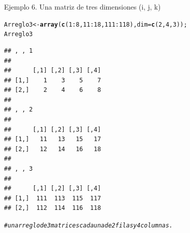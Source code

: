 \documentclass[12pt,letterpaper]{article}\usepackage[]{graphicx}\usepackage[]{color}
\makeatletter
\newcommand{\hlnum}[1]{\textcolor[rgb]{0.686,0.059,0.569}{#1}}%
\newcommand{\hlcom}[1]{\textcolor[rgb]{0.678,0.584,0.686}{\textit{#1}}}%
\newcommand{\hlopt}[1]{\textcolor[rgb]{0,0,0}{#1}}%
\newcommand{\hlstd}[1]{\textcolor[rgb]{0.345,0.345,0.345}{#1}}%
\newcommand{\hlkwb}[1]{\textcolor[rgb]{0.69,0.353,0.396}{#1}}%
\newcommand{\hlkwc}[1]{\textcolor[rgb]{0.333,0.667,0.333}{#1}}%
\newcommand{\hlkwd}[1]{\textcolor[rgb]{0.737,0.353,0.396}{\textbf{#1}}}%
\newenvironment{kframe}{%
 \def\at@end@of@kframe{}%
 \ifinner\ifhmode%
  \def\at@end@of@kframe{\end{minipage}}%
  \begin{minipage}{\columnwidth}%
 \fi\fi%
 \def\FrameCommand##1{\hskip\@totalleftmargin \hskip-\fboxsep
 \colorbox{shadecolor}{##1}\hskip-\fboxsep
     \hskip-\linewidth \hskip-\@totalleftmargin \hskip\columnwidth}%
 \MakeFramed {\advance\hsize-\width
   \@totalleftmargin\z@ \linewidth\hsize
   \@setminipage}}%
 {\par\unskip\endMakeFramed%
 \at@end@of@kframe}
\newenvironment{knitrout}{}{} %
\makeatother
\begin{document}
Ejemplo 6. Una matriz de tres dimensiones (i, j, k)
\begin{knitrout}
\color{fgcolor}\begin{kframe}
\begin{alltt}
\hlstd{Arreglo3} \hlkwb{<-} \hlkwd{array}\hlstd{(}\hlkwd{c}\hlstd{(}\hlnum{1}\hlopt{:}\hlnum{8}\hlstd{,} \hlnum{11}\hlopt{:}\hlnum{18}\hlstd{,} \hlnum{111}\hlopt{:}\hlnum{118}\hlstd{),} \hlkwc{dim} \hlstd{=} \hlkwd{c}\hlstd{(}\hlnum{2}\hlstd{,} \hlnum{4}\hlstd{,} \hlnum{3}\hlstd{));}
\hlstd{Arreglo3}
\end{alltt}
\begin{verbatim}
## , , 1
## 
##      [,1] [,2] [,3] [,4]
## [1,]    1    3    5    7
## [2,]    2    4    6    8
## 
## , , 2
## 
##      [,1] [,2] [,3] [,4]
## [1,]   11   13   15   17
## [2,]   12   14   16   18
## 
## , , 3
## 
##      [,1] [,2] [,3] [,4]
## [1,]  111  113  115  117
## [2,]  112  114  116  118
\end{verbatim}
\begin{alltt}
\hlcom{# un arreglo de 3 matrices cada una de 2 filas y 4 columnas.}
\end{alltt}
\end{kframe}
\end{knitrout}
\end{document}
